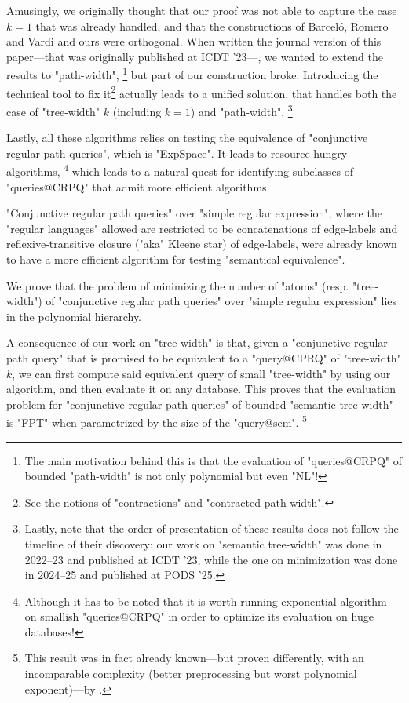 Amusingly, we originally thought that our proof was not able to
capture the case $k=1$ that was already handled, and that the constructions
of Barceló, Romero and Vardi and ours were orthogonal.
When written the journal version of this paper---that was originally
published at ICDT '23---, we wanted to extend the results to "path-width",%
\footnote{The main motivation behind this is that the evaluation of "queries@CRPQ"
of bounded "path-width" is not only polynomial but even "NL"!}
but part of our construction broke. Introducing the technical tool
to fix it\footnote{See the notions of "contractions" and "contracted path-width".}
actually leads to a unified solution, that handles both
the case of "tree-width" $k$ (including $k=1$) and "path-width".%
\footnote{Lastly, note that the order of presentation of these results
does not follow the timeline of their discovery: our work on "semantic tree-width"
was done in 2022--23 and published at ICDT '23, while the one on minimization
was done in 2024--25 and published at PODS '25.}

Lastly, all these algorithms relies on testing the equivalence
of "conjunctive regular path queries", which is "ExpSpace".
It leads to resource-hungry algorithms,%
\footnote{Although it has to be noted that it is worth running exponential
algorithm on smallish "queries@CRPQ" in order to optimize
its evaluation on huge databases!}
which leads to a natural quest for identifying subclasses
of "queries@CRPQ" that admit more efficient algorithms.

"Conjunctive regular path queries" over "simple regular expression",
where the "regular languages" allowed are restricted to be concatenations of
edge-labels and reflexive-transitive closure ("aka" Kleene star) of
edge-labels, were already known to have a more efficient
algorithm for testing "semantical equivalence".

\begin{contribution}
	We prove that the problem of minimizing the number of "atoms" (resp. "tree-width")
	of "conjunctive regular path queries" over "simple regular expression"
	lies in the polynomial hierarchy.
\end{contribution}

A consequence of our work on "tree-width" is that,
given a "conjunctive regular path query" that is promised to be equivalent
to a "query@CPRQ" of "tree-width" $k$, we can first compute said
equivalent query of small "tree-width" by using our algorithm,
and then evaluate it on any database. This proves that the evaluation
problem for "conjunctive regular path queries" of bounded "semantic tree-width"
is "FPT" when parametrized by the size of the "query@sem".%
\footnote{This result was in fact already known---but proven differently, with
an incomparable complexity (better preprocessing but worst polynomial exponent)---by
.}

